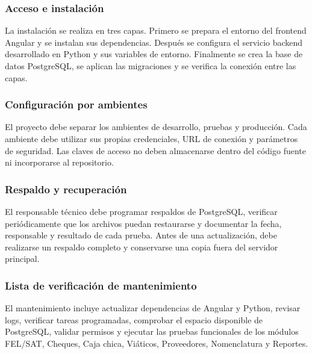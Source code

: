 \subsubsection{Acceso e instalación}
La instalación se realiza en tres capas. Primero se prepara el entorno del frontend Angular y se instalan sus dependencias. Después se configura el servicio backend desarrollado en Python y sus variables de entorno. Finalmente se crea la base de datos PostgreSQL, se aplican las migraciones y se verifica la conexión entre las capas.

\subsubsection{Configuración por ambientes}
El proyecto debe separar los ambientes de desarrollo, pruebas y producción. Cada ambiente debe utilizar sus propias credenciales, URL de conexión y parámetros de seguridad. Las claves de acceso no deben almacenarse dentro del código fuente ni incorporarse al repositorio.

\subsubsection{Respaldo y recuperación}
El responsable técnico debe programar respaldos de PostgreSQL, verificar periódicamente que los archivos puedan restaurarse y documentar la fecha, responsable y resultado de cada prueba. Antes de una actualización, debe realizarse un respaldo completo y conservarse una copia fuera del servidor principal.

\subsubsection{Lista de verificación de mantenimiento}
El mantenimiento incluye actualizar dependencias de Angular y Python, revisar logs, verificar tareas programadas, comprobar el espacio disponible de PostgreSQL, validar permisos y ejecutar las pruebas funcionales de los módulos FEL/SAT, Cheques, Caja chica, Viáticos, Proveedores, Nomenclatura y Reportes.


